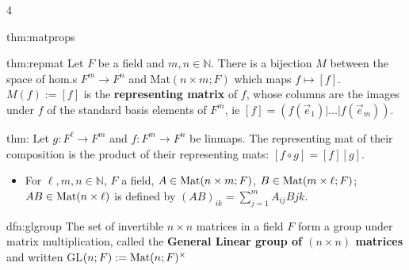 \documentclass[landscape, 8pt]{extarticle}
\begin{document}
\begin{multicols*}{4}
\begin{thm}{thm:matprops}{ }
		
		\end{thm}
		
		
		\begin{thm}{thm:repmat}{ }
		Let $F$ be a field and $m, n \in \mathbb{N}$. There is a bijection $M$ between the space of hom.s $F^m \to F^n$ and Mat$(n \times m; F)$ which maps $f \mapsto [f]$. $M(f) := [f]$ is the \textbf{representing matrix} of $f$, whose columns are the images under $f$ of the standard basis elements of $F^m$, ie $[f] = (f(\vec{e}_1)|\dots|f(\vec{e}_m))$.
		
		\end{thm}
		
		
		\begin{thm}{thm:}{ }
			Let $g: F^\ell \to F^m$ and $f:F^m \to F^n$ be linmaps. The representing mat of their composition is the product of their representing mats: $[f \circ g] = [f][g]$.
			\begin{itemize}
				\item For $\ell, m, n \in \mathbb{N}$, $F$ a field, $A \in \operatorname{Mat}(n\times m; F)$, $B \in\operatorname{Mat}(m \times \ell ; F)$; $AB \in \operatorname{Mat}(n \times \ell)$ is defined by $(AB)_{ik} = \sum_{j = 1}^{m}A_{ij} B{jk}$.
			\end{itemize}
			
		\end{thm}
		
		
		\begin{dfn}{dfn:glgroup}{ }
			The set of invertible $n\times n$ matrices in a field $F$ form a group under matrix multiplication, called the \textbf{General Linear group of $(n\times n)$ matrices} and written GL$(n; F) :=\operatorname{Mat}(n; F)^\times$
			
		\end{dfn}
		

\end{multicols*}
\end{document}
